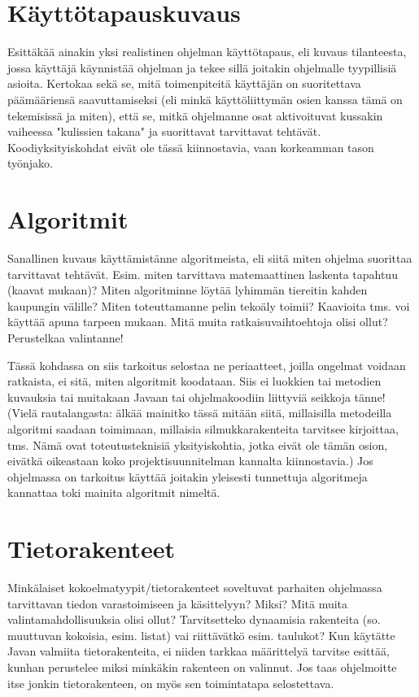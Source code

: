 \documentclass[a4paper,11pt]{article}
\begin{document}
\section{Käyttötapauskuvaus}

      Esittäkää ainakin yksi realistinen ohjelman käyttötapaus, eli kuvaus tilanteesta, jossa käyttäjä käynnistää ohjelman ja tekee sillä joitakin ohjelmalle tyypillisiä asioita. Kertokaa sekä se, mitä toimenpiteitä käyttäjän on suoritettava päämääriensä saavuttamiseksi (eli minkä käyttöliittymän osien kanssa tämä on tekemisissä ja miten), että se, mitkä ohjelmanne osat aktivoituvat kussakin vaiheessa "kulissien takana" ja suorittavat tarvittavat tehtävät. Koodiyksityiskohdat eivät ole tässä kiinnostavia, vaan korkeamman tason työnjako.
\section{Algoritmit}

      Sanallinen kuvaus käyttämistänne algoritmeista, eli siitä miten ohjelma suorittaa tarvittavat tehtävät. Esim. miten tarvittava matemaattinen laskenta tapahtuu (kaavat mukaan)? Miten algoritminne löytää lyhimmän tiereitin kahden kaupungin välille? Miten toteuttamanne pelin tekoäly toimii? Kaavioita tms. voi käyttää apuna tarpeen mukaan. Mitä muita ratkaisuvaihtoehtoja olisi ollut? Perustelkaa valintanne!

      Tässä kohdassa on siis tarkoitus selostaa ne periaatteet, joilla ongelmat voidaan ratkaista, ei sitä, miten algoritmit koodataan. Siis ei luokkien tai metodien kuvauksia tai muitakaan Javaan tai ohjelmakoodiin liittyviä seikkoja tänne! (Vielä rautalangasta: älkää mainitko tässä mitään siitä, millaisilla metodeilla algoritmi saadaan toimimaan, millaisia silmukkarakenteita tarvitsee kirjoittaa, tms. Nämä ovat toteutusteknisiä yksityiskohtia, jotka eivät ole tämän osion, eivätkä oikeastaan koko projektisuunnitelman kannalta kiinnostavia.) Jos ohjelmassa on tarkoitus käyttää joitakin yleisesti tunnettuja algoritmeja kannattaa toki mainita algoritmit nimeltä.
\section{Tietorakenteet}

      Minkälaiset kokoelmatyypit/tietorakenteet soveltuvat parhaiten ohjelmassa tarvittavan tiedon varastoimiseen ja käsittelyyn? Miksi? Mitä muita valintamahdollisuuksia olisi ollut? Tarvitsetteko dynaamisia rakenteita (so. muuttuvan kokoisia, esim. listat) vai riittävätkö esim. taulukot? Kun käytätte Javan valmiita tietorakenteita, ei niiden tarkkaa määrittelyä tarvitse esittää, kunhan perustelee miksi minkäkin rakenteen on valinnut. Jos taas ohjelmoitte itse jonkin tietorakenteen, on myös sen toimintatapa selostettava.
\end{document}
